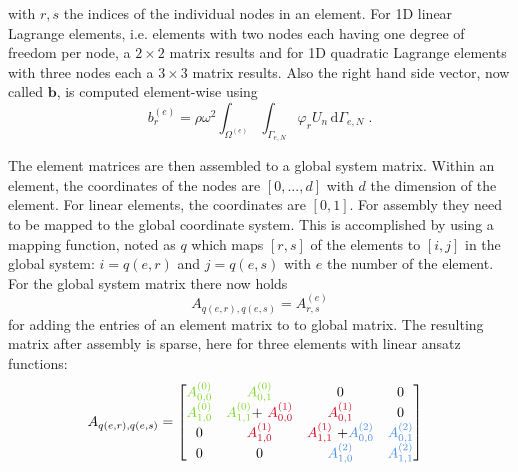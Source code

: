 \documentclass[%
  a4paper,oneside,%
  11pt,%
  smallchapters,
  style=printdev,
  extramargin,
  green,%
  rgb, <cmyk>
  ]{tubsbook}
\begin{document}
with $r,s$ the indices of the individual nodes in an element. For 1D linear Lagrange elements, i.e. elements with two nodes each having one degree of freedom per node, a $2\times 2$ matrix results and for 1D quadratic Lagrange elements with three nodes each a $3\times3$ matrix results.
%
Also the right hand side vector, now called $\bm{b}$, is computed element-wise using
\begin{equation}
b_r^{(e)} = \rho \omega^2 \int_{\Omega^{(e)}} \int_{\Gamma_{e,N}} \varphi_r U_n \,\mathrm{d}\Gamma_{e,N} \;.
\end{equation}


The element matrices are then assembled to a global system matrix. Within an element, the coordinates of the nodes are $[0,...,d]$ with $d$ the dimension of the element. For linear elements, the coordinates are $[0,1]$. For assembly they need to be mapped to the global coordinate system. This is accomplished by using a mapping function, noted as $q$ which maps $[r,s]$ of the elements to $[i,j]$ in the global system: $i=q(e,r)$ and $j = q(e,s)$ with $e$ the number of the element. For the global system matrix there now holds
\begin{equation}
A_{q(e,r), q(e,s)} =  A_{r,s}^{(e)}
\end{equation}
for adding the entries of an element matrix to to global matrix.
The resulting matrix after assembly is sparse, here for three elements with linear ansatz functions:
\begin{equation}
A_{q(e,r), q(e,s)}  =
\begin{bmatrix}
\textcolor[rgb]{0.49,0.83,0.13}{A_{0,0}^{( 0)}} & \textcolor[rgb]{0.49,0.83,0.13}{A}\textcolor[rgb]{0.49,0.83,0.13}{_{0,1}^{( 0)}} & 0 & 0\\
\textcolor[rgb]{0.49,0.83,0.13}{A}\textcolor[rgb]{0.49,0.83,0.13}{_{1,0}^{( 0)}} & \textcolor[rgb]{0.49,0.83,0.13}{A}\textcolor[rgb]{0.49,0.83,0.13}{_{1,1}^{( 0)}}\textcolor[rgb]{0,0,0}{+}\textcolor[rgb]{0.49,0.83,0.13}{\ }\textcolor[rgb]{0.82,0.01,0.11}{A_{0,0}^{( 1)}} & \textcolor[rgb]{0.82,0.01,0.11}{A}\textcolor[rgb]{0.82,0.01,0.11}{_{0,1}^{( 1)}} & 0\\
0 & \textcolor[rgb]{0.82,0.01,0.11}{A}\textcolor[rgb]{0.82,0.01,0.11}{_{1,0}^{( 1)}} & \textcolor[rgb]{0.82,0.01,0.11}{A}\textcolor[rgb]{0.82,0.01,0.11}{_{1,1}^{( 1)} \ }\textcolor[rgb]{0,0,0}{+}\textcolor[rgb]{0.29,0.56,0.89}{A_{0,0}^{( 2)}} & \textcolor[rgb]{0.29,0.56,0.89}{A}\textcolor[rgb]{0.29,0.56,0.89}{_{0,1}^{( 2)}}\\
0 & 0 & \textcolor[rgb]{0.29,0.56,0.89}{A}\textcolor[rgb]{0.29,0.56,0.89}{_{1,0}^{( 2)}} & \textcolor[rgb]{0.29,0.56,0.89}{A}\textcolor[rgb]{0.29,0.56,0.89}{_{1,1}^{( 2)}}
\end{bmatrix} \ \ 
\label{eqn:Assembly}
\end{equation}
\end{document}
